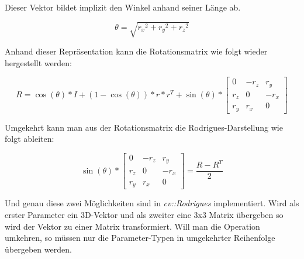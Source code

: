 \documentclass[main.tex]{subfiles}
\begin{document}
Dieser Vektor bildet implizit den Winkel anhand seiner Länge ab.

\begin{equation}
\theta = \sqrt{{r_x}^2 + {r_y}^2 + {r_z}^2}
\end{equation}

Anhand dieser Repräsentation kann die Rotationsmatrix wie folgt wieder hergestellt werden:

\begin{equation}
R = \cos(\theta) * I + (1 - \cos(\theta)) * r * r^T + \sin(\theta) * 
\begin{bmatrix}
0 & -r_z & r_y \\
r_z & 0 & -r_x \\
r_y & r_x & 0
\end{bmatrix}
\end{equation}

Umgekehrt kann man aus der Rotationsmatrix die Rodrigues-Darstellung wie folgt ableiten:

\begin{equation}
\sin(\theta) * 
\begin{bmatrix}
0 & -r_z & r_y \\
r_z & 0 & -r_x \\
r_y & r_x & 0
\end{bmatrix}
= 
\frac{R - R^T}{2}
\end{equation}

Und genau diese zwei Möglichkeiten sind in \textit{cv::Rodrigues} implementiert. Wird als erster Parameter ein 3D-Vektor und als zweiter eine 3x3 Matrix übergeben so wird der Vektor zu einer Matrix transformiert. Will man die Operation umkehren, so müssen nur die Parameter-Typen in umgekehrter Reihenfolge übergeben werden.
\end{document}
